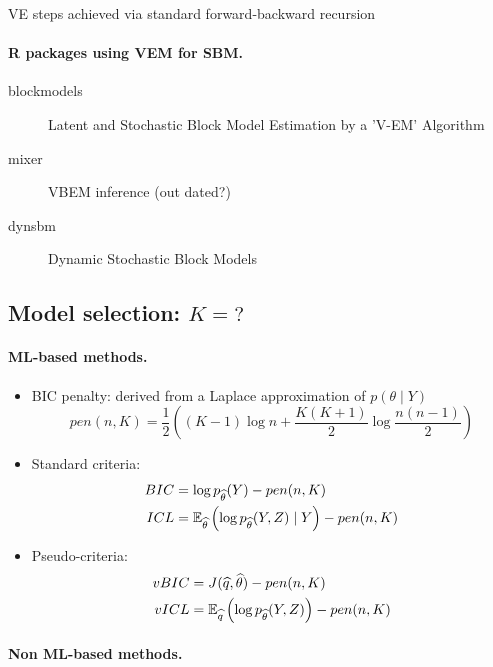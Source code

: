 \ra VE steps achieved via standard forward-backward recursion

\jump \paragraph{R packages using VEM for SBM.}
\begin{description}
\item[blockmodels] Latent and Stochastic Block Model Estimation by a 'V-EM' Algorithm
\item[mixer] VBEM inference (out dated?)
\item[dynsbm] Dynamic Stochastic Block Models
\end{description}

\blank
\subsection{Model selection: $K = ?$ \todo{}}

\jump \paragraph{ML-based methods.} 
\begin{itemize}
\item BIC penalty: derived from a Laplace approximation of $p(\theta \mid Y)$
  $$
  pen(n, K) = \frac12 \left((K-1) \log n + \frac{K(K+1)}2 \log \frac{n(n-1)}2\right)
  $$
\item Standard criteria: 
\begin{align*}
 BIC & = \log p_{\widehat{\theta}}(Y) - pen(n, K) \\
 ICL & = \mathbb E_{\widehat{\theta}}\left(\log p_{\widehat{\theta}}(Y, Z) \mid Y\right) - pen(n, K) 
\end{align*}
\item Pseudo-criteria: 
\begin{align*}
 vBIC & = J(\widehat{q}, \widehat{\theta}) - pen(n, K) \\
 vICL & = \mathbb E_{\widehat{q}}\left(\log p_{\widehat{\theta}}(Y, Z)\right) - pen(n, K) 
\end{align*}
\end{itemize}

\jump \paragraph{Non ML-based methods. \todo{}} ~

